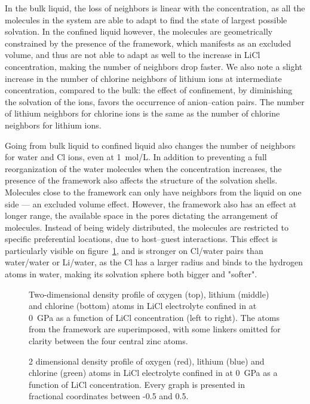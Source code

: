 \documentclass[thesis]{subfiles}
\begin{document}
In the bulk liquid, the loss of neighbors is linear with the concentration, as
all the molecules in the system are able to adapt to find the state of largest
possible solvation. In the confined liquid however, the molecules are
geometrically constrained by the presence of the  framework, which
manifests as an excluded volume, and thus are not able to adapt as well to the
increase in LiCl concentration, making the number of neighbors drop faster. We
also note a slight increase in the number of chlorine neighbors of lithium ions
at intermediate concentration, compared to the bulk: the effect of confinement,
by diminishing the solvation of the ions, favors the occurrence of anion--cation
pairs. The number of lithium neighbors for chlorine ions is the same as the
number of chlorine neighbors for lithium ions.

Going from bulk liquid to confined liquid also changes the number of neighbors
for water and Cl ions, even at \SI{1}{mol/L}. In addition to preventing a full
reorganization of the water molecules when the concentration increases, the
presence of the framework also affects the structure of the solvation shells.
Molecules close to the framework can only have neighbors from the liquid on one
side --- an excluded volume effect. However, the framework also has an effect at
longer range, the available space in the pores dictating the arrangement of
molecules. Instead of being widely distributed, the molecules are restricted to
specific preferential locations, due to host--guest interactions. This effect is
particularly visible on figure~\ref{fig:licl-zif:density}, and is stronger on Cl/water
pairs than water/water or Li/water, as the Cl has a larger radius and binds to
the hydrogen atoms in water, making its solvation sphere both bigger and
"softer".

\begin{figure}[ht]
    \centering
    
    \caption{Two-dimensional density profile of oxygen (top), lithium (middle) and
    chlorine (bottom) atoms in LiCl electrolyte confined in  at \SI{0}{GPa}
    as a function of LiCl concentration (left to right). The atoms from the
     framework are superimposed, with some linkers omitted for clarity
    between the four central zinc atoms.}
    \label{fig:licl-zif:density}
\end{figure}

\begin{figure}[p]
    \centering
    
    \caption{2 dimensional density profile of oxygen (red), lithium (blue) and
    chlorine (green) atoms in LiCl electrolyte confined in  at \SI{0}{GPa}
    as a function of LiCl concentration. Every graph is presented in fractional
    coordinates between -0.5 and 0.5.}
    \label{fig:licl-zif:density:all}
\end{figure}
\end{document}
